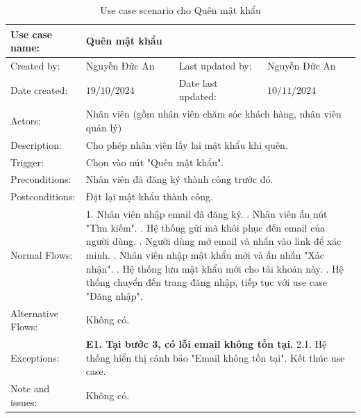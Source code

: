 \begin{table}[H]
	\centering
	\begin{tabular}{|l|l|l|l|} 
		\hline Use case name: & \multicolumn{3}{|l|}{Quên mật khẩu} \\ 
		\hline Created by: & Nguyễn Đức An & Last updated by: & Nguyễn Đức An \\ 
		\hline Date created: & $19 / 10 / 2024$ & Date last updated: & $10 / 11 / 2024$\\ 
		\hline Actors: & \multicolumn{3}{|l|}{ Nhân viên (gồm nhân viên chăm sóc khách hàng, nhân viên quản lý) } \\ 
		\hline Description: & \multicolumn{3}{|p{12cm}|}{ Cho phép nhân viên lấy lại mật khẩu khi quên. } \\ 
		\hline Trigger: & \multicolumn{3}{|p{12cm}|}{ Chọn vào nút "Quên mật khẩu". } \\ 
		\hline Preconditions: & \multicolumn{3}{|p{12cm}|}{ Nhân viên đã đăng ký thành công trước đó. } \\ 
		\hline Postconditions: & \multicolumn{3}{|p{12cm}|}{ Đặt lại mật khẩu thành công. } \\ 
		\hline Normal Flows: & \multicolumn{3}{|p{12cm}|}{ 
			1. Nhân viên nhập email đã đăng ký. \newline 
			2. Nhân viên ấn nút "Tìm kiếm". \newline 
			3. Hệ thống gửi mã khôi phục đến email của người dùng. \newline 
			4. Người dùng mở email và nhấn vào link để xác minh. \newline 
			5. Nhân viên nhập mật khẩu mới và ấn nhấn "Xác nhận". \newline 
			6. Hệ thống lưu mật khẩu mới cho tài khoản này. \newline
			7. Hệ thống chuyển đến trang đăng nhập, tiếp tục với use case "Đăng nhập". 
		} \\ 
		\hline Alternative Flows: & \multicolumn{3}{|p{12cm}|}{ 
			Không có.
		} \\ 
		\hline Exceptions: & \multicolumn{3}{|p{12cm}|}{ 
			\textbf{E1. Tại bước 3, có lỗi email không tồn tại.} \newline 
			\hspace{0.5cm}2.1. Hệ thống hiển thị cảnh báo "Email không tồn tại". \newline
            \hspace{0.5cm}Kết thúc use case. 
		} \\ 
		\hline Note and issues: & \multicolumn{3}{|p{12cm}|}{ Không có. } \\ 
		\hline
	\end{tabular}
	\caption{Use case scenario cho Quên mật khẩu}
\end{table}

